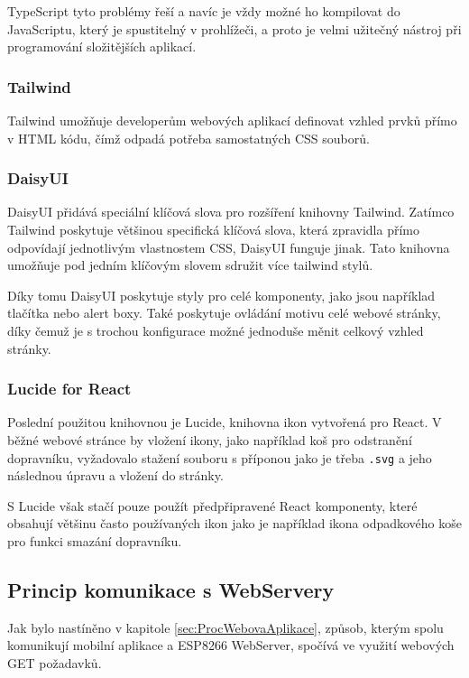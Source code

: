 TypeScript tyto problémy řeší a navíc je vždy možné ho kompilovat do JavaScriptu, který je spustitelný v prohlížeči, a proto je velmi užitečný nástroj při programování složitějších aplikací.
\cite{TSweb}

\subsubsection{Tailwind}
Tailwind umožňuje developerům webových aplikací definovat vzhled prvků přímo v HTML kódu, čímž odpadá potřeba samostatných CSS souborů.
\cite{Tailwindweb}

\subsubsection{DaisyUI}\label{sec:DaisyUI}
DaisyUI přidává speciální klíčová slova pro rozšíření knihovny Tailwind. Zatímco Tailwind poskytuje většinou specifická klíčová slova, která zpravidla přímo odpovídají jednotlivým vlastnostem CSS, DaisyUI funguje jinak. Tato knihovna umožňuje pod jedním klíčovým slovem sdružit více tailwind stylů.
\cite{daisyuiweb}

Díky tomu DaisyUI poskytuje styly pro celé komponenty, jako jsou například tlačítka nebo alert boxy. Také poskytuje ovládání motivu celé webové stránky, díky čemuž je s trochou konfigurace možné jednoduše měnit celkový vzhled stránky.

\subsubsection{Lucide for React}
Poslední použitou knihovnou je Lucide, knihovna ikon vytvořená pro React. V běžné webové stránce by vložení ikony, jako například koš pro odstranění dopravníku, vyžadovalo stažení souboru s příponou jako je třeba \texttt{.svg} a jeho následnou úpravu a vložení do stránky.

S Lucide však stačí pouze použít předpřipravené React komponenty, které obsahují většinu často používaných ikon jako je například ikona odpadkového koše pro funkci smazání dopravníku.
\cite{lucideWeb}

\subsection{Princip komunikace s WebServery}\label{sec:PrincipKomunikaceSeServery}

Jak bylo nastíněno v kapitole \ref{sec:ProcWebovaAplikace}, způsob, kterým spolu komunikují mobilní aplikace a ESP8266 WebServer, spočívá ve využití webových GET požadavků.

